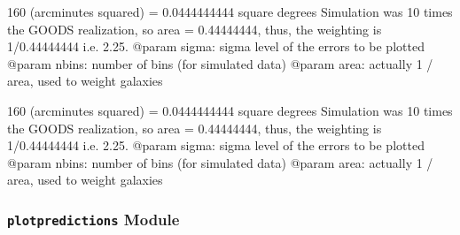\documentclass[letterpaper,10pt,english]{sphinxmanual}
\begin{document}

\begin{fulllineitems}
\label{SamPy.herschel:SamPy.herschel.plotnumbercounts.plot_number_counts2}
160 (arcminutes squared) = 0.0444444444 square degrees
Simulation was 10 times the GOODS realization, so
area = 0.44444444, thus, the weighting is 1/0.44444444
i.e. 2.25.
@param sigma: sigma level of the errors to be plotted
@param nbins: number of bins (for simulated data)
@param area: actually 1 / area, used to weight galaxies

\end{fulllineitems}



\begin{fulllineitems}
\label{SamPy.herschel:SamPy.herschel.plotnumbercounts.plot_number_counts3}
160 (arcminutes squared) = 0.0444444444 square degrees
Simulation was 10 times the GOODS realization, so
area = 0.44444444, thus, the weighting is 1/0.44444444
i.e. 2.25.
@param sigma: sigma level of the errors to be plotted
@param nbins: number of bins (for simulated data)
@param area: actually 1 / area, used to weight galaxies

\end{fulllineitems}



\subsubsection{\texttt{plotpredictions} Module}
\label{SamPy.herschel:plotpredictions-module}\label{SamPy.herschel:module-SamPy.herschel.plotpredictions}
\end{document}
